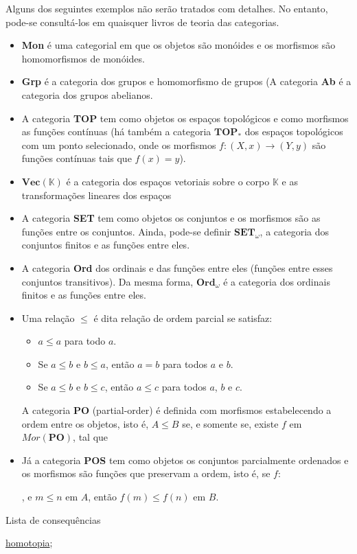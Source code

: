 \begin{ex}
	Alguns dos seguintes exemplos não serão tratados com detalhes. No entanto, pode-se consultá-los em quaisquer livros de teoria das categorias.
\begin{itemize}
\item \textbf{Mon} é uma categorial em que os objetos são monóides e os morfismos são homomorfismos de monóides.
\item \textbf{Grp} é a categoria dos grupos e homomorfismo de grupos (A categoria \textbf{Ab} é a categoria dos grupos abelianos.
\item A categoria \textbf{TOP} tem como objetos os espaços topológicos e como morfismos as funções contínuas (há também a categoria $\mathbf{TOP_*}$ dos espaços topológicos com um ponto selecionado, onde os morfismos $f:(X,x) \longrightarrow (Y,y)$ são funções contínuas tais que $f(x) = y$).
\item $\mathbf{Vec(\mathbb{K})}$ é a categoria dos espaços vetoriais sobre o corpo $\mathbb{K}$ e as transformações lineares dos espaços
\item A categoria \textbf{SET} tem como objetos os conjuntos e os morfismos são as funções entre os conjuntos. Ainda, pode-se definir $\mathbf{SET}_\omega$, a categoria dos conjuntos finitos e as funções entre eles.
\item A categoria \textbf{Ord} dos ordinais e das funções entre eles (funções entre esses conjuntos transitivos). Da mesma forma, $\mathbf{Ord}_\omega$ é a categoria dos ordinais finitos e as funções entre eles.

\item Uma relação $\leq$ é dita relação de ordem parcial se satisfaz:
\begin{itemize}
    \item $a \leq a$ para todo $a$.
    \item Se $a \leq b$ e $b \leq a$, então $a = b$ para todos $a$ e $b$.
    \item Se $a \leq b$ e $b \leq c$, então $a \leq c$ para todos $a$, $b$ e $c$.
\end{itemize}
A categoria $\mathbf{PO}$ (partial-order) é definida com morfismos estabelecendo a ordem entre os objetos, isto é, $A \leq B$ se, e somente se, existe $f$ em $Mor(\mathbf{PO})$, tal que %
\item Já a categoria \textbf{POS} tem como objetos os conjuntos parcialmente ordenados e os morfismos são funções que preservam a ordem, isto é, se $f:$ %
, e $m \leq n$ em $A$, então $f(m) \leq f(n)$ em $B$.




\end{itemize}

\end{ex}


\begin{titlemize}{Lista de consequências}
	\item \hyperref[homotopia]{homotopia};\\ %
\end{titlemize}
